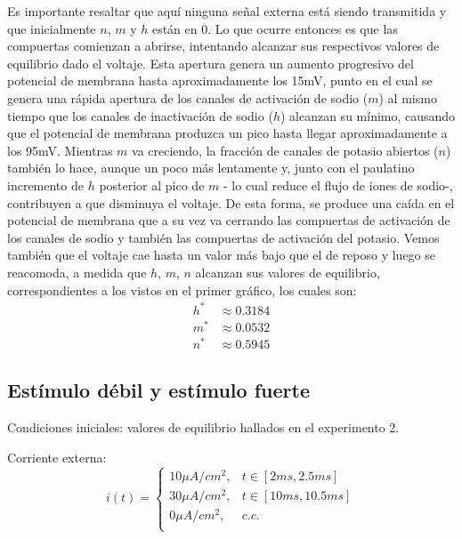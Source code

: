 \documentclass[aps,twocolumn,groupedaddress]{revtex4-2}
\begin{document}
Es importante resaltar que aquí ninguna señal externa está siendo transmitida y que inicialmente $n$, $m$ y $h$ están en 0. Lo que ocurre entonces es que las compuertas comienzan a abrirse, intentando alcanzar sus respectivos valores de equilibrio dado el voltaje. Esta apertura genera un aumento progresivo del potencial de membrana hasta aproximadamente los 15mV, punto en el cual se genera una rápida apertura de los canales de activación de sodio ($m$) al mismo tiempo que los canales de inactivación de sodio ($h$) alcanzan su mínimo, causando que el potencial de membrana produzca un pico hasta llegar aproximadamente a los 95mV. Mientras $m$ va creciendo, la fracción de canales de potasio abiertos ($n$) también lo hace, aunque un poco más lentamente y, junto con el paulatino incremento de $h$ posterior al pico de $m$ - lo cual reduce el flujo de iones de sodio-, contribuyen a que disminuya el voltaje. De esta forma, se produce una caída en el potencial de membrana que a su vez va cerrando las compuertas de activación de los canales de sodio y también las compuertas de activación del potasio. Vemos también que el voltaje cae hasta un valor más bajo que el de reposo y luego se reacomoda, a medida que $h$, $m$, $n$ alcanzan sus valores de equilibrio, correspondientes a los vistos en el primer gráfico, los cuales son:
\begin{eqnarray}
h^* &\approx 0.3184 \nonumber\\
m^* &\approx 0.0532 \nonumber\\
n^* &\approx 0.5945 \nonumber
\end{eqnarray}

\subsection{Estímulo débil y estímulo fuerte}
Condiciones iniciales: valores de equilibrio hallados en el experimento 2.

Corriente externa:
$$
i(t) = \left\{
\begin{array}{ll}
10 \mu A/cm^2, & t\in [2ms,2.5ms] \\
30 \mu A/cm^2, & t\in [10ms,10.5ms] \\
0 \mu A/cm^2, & c.c. \\
\end{array}
\right.
$$
\end{document}
